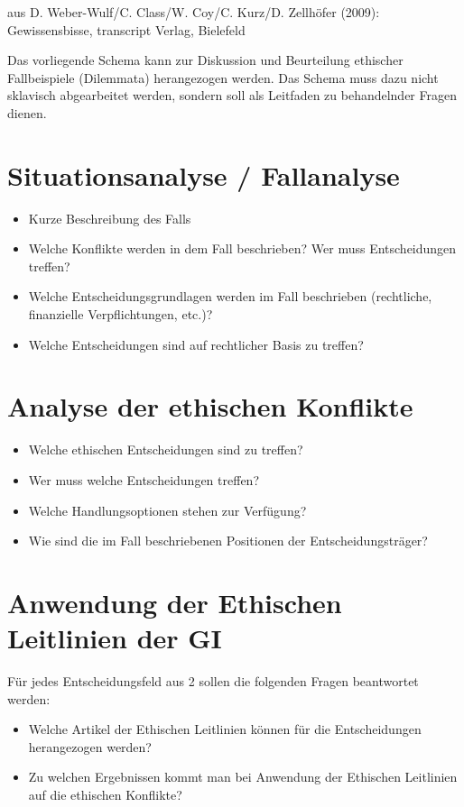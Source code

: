 \documentclass[10pt, a5paper]{arbeitsblatt}
\begin{document}
\TITEL

{\small aus D. Weber-Wulf/C. Class/W. Coy/C. Kurz/D. Zellhöfer (2009): Gewissensbisse, transcript Verlag, Bielefeld}\smallskip

Das vorliegende Schema kann zur Diskussion und Beurteilung ethischer Fallbeispiele (Dilemmata) herangezogen werden. Das Schema muss dazu nicht sklavisch abgearbeitet werden, sondern soll als Leitfaden zu behandelnder Fragen dienen.
\section{Situationsanalyse / Fallanalyse}
\begin{itemize}
	\item Kurze Beschreibung des Falls
	\item Welche Konflikte werden in dem Fall beschrieben? Wer muss Entscheidungen treffen?
	\item Welche Entscheidungsgrundlagen werden im Fall beschrieben (rechtliche, finanzielle Verpflichtungen, etc.)?
	\item Welche Entscheidungen sind auf rechtlicher Basis zu treffen?
\end{itemize}

\section{Analyse der ethischen Konflikte}
\begin{itemize}
	\item Welche ethischen Entscheidungen sind zu treffen?
	\item Wer muss welche Entscheidungen treffen?
	\item Welche Handlungsoptionen stehen zur Verfügung?
	\item Wie sind die im Fall beschriebenen Positionen der Entscheidungsträger?
\end{itemize}

\section{Anwendung der Ethischen Leitlinien der GI}
Für jedes Entscheidungsfeld aus 2 sollen die folgenden Fragen beantwortet werden:
\begin{itemize}
	\item Welche Artikel der Ethischen Leitlinien können für die Entscheidungen herangezogen werden?
	\item Zu welchen Ergebnissen kommt man bei Anwendung der Ethischen Leitlinien auf die ethischen Konflikte?
\end{itemize}
\end{document}
